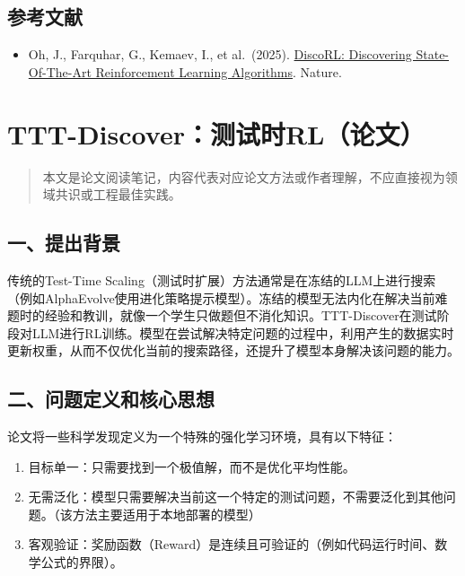 \hypertarget{ux53c2ux8003ux6587ux732e-144}{%
\subsection{参考文献}\label{ux53c2ux8003ux6587ux732e-144}}

\begin{itemize}
\tightlist
\item
  Oh, J., Farquhar, G., Kemaev, I., et al.~(2025). \href{https://www.nature.com/articles/s41586-025-09761-x}{DiscoRL: Discovering State-Of-The-Art Reinforcement Learning Algorithms}. Nature.
\end{itemize}

\clearpage

\hypertarget{ttt-discoverux6d4bux8bd5ux65f6rlux8bbaux6587}{%
\section{TTT-Discover：测试时RL（论文）}\label{ttt-discoverux6d4bux8bd5ux65f6rlux8bbaux6587}}

\begin{quote}
本文是论文阅读笔记，内容代表对应论文方法或作者理解，不应直接视为领域共识或工程最佳实践。
\end{quote}

\hypertarget{ux4e00ux63d0ux51faux80ccux666f-5}{%
\subsection{一、提出背景}\label{ux4e00ux63d0ux51faux80ccux666f-5}}

传统的Test-Time Scaling（测试时扩展）方法通常是在冻结的LLM上进行搜索（例如AlphaEvolve使用进化策略提示模型）。冻结的模型无法内化在解决当前难题时的经验和教训，就像一个学生只做题但不消化知识。TTT-Discover在测试阶段对LLM进行RL训练。模型在尝试解决特定问题的过程中，利用产生的数据实时更新权重，从而不仅优化当前的搜索路径，还提升了模型本身解决该问题的能力。

\hypertarget{ux4e8cux95eeux9898ux5b9aux4e49ux548cux6838ux5fc3ux601dux60f3}{%
\subsection{二、问题定义和核心思想}\label{ux4e8cux95eeux9898ux5b9aux4e49ux548cux6838ux5fc3ux601dux60f3}}

论文将一些科学发现定义为一个特殊的强化学习环境，具有以下特征：

\begin{enumerate}
\def\labelenumi{\arabic{enumi}.}
\item
  目标单一：只需要找到一个极值解，而不是优化平均性能。
\item
  无需泛化：模型只需要解决当前这一个特定的测试问题，不需要泛化到其他问题。（该方法主要适用于本地部署的模型）
\item
  客观验证：奖励函数（Reward）是连续且可验证的（例如代码运行时间、数学公式的界限）。
\end{enumerate}

